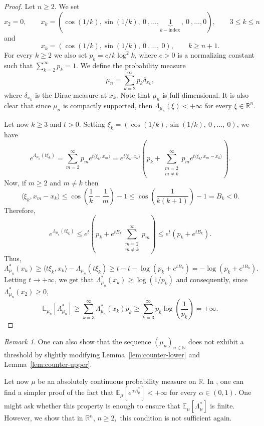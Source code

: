 \documentclass[11pt,a4paper]{article} %
\theoremstyle{definition}
\theoremstyle{remark}
\newtheorem{remark}[theorem]{Remark}
\newcommand{\1}{\mathds{1}}
\begin{document}
\begin{proof}
Let $n\geq 2$. We set $$x_2=0, \qquad x_k=(\cos (1/k), \sin (1/k),
\ 0\ , \ldots,\underbrace{1}_{k-\text{index} \ } ,\ 0\ ,\ldots,0), \qquad 3 \leq k\leq n $$ and $$x_k=(\cos(1/k),\sin(1/k), \ 0\ ,\ldots, \ 0), \qquad k \geq n+1 .$$ For every $k \geq 2$ we also set  $p_k=c/k \log^2 k$, where $c>0$ is a normalizing constant such that $\sum_{k=2}^{\infty}p_k=1$. We define the probability measure $$\mu_n= \sum\limits_{k=2}^{\infty} p_k \delta_{x_k},$$ where $\delta_{x_k}$ is the Dirac measure at $x_k$. Note that $\mu_n$ is full-dimensional. It is also clear that  since $\mu_n$ is compactly supported, then $\Lambda_{\mu_n}(\xi) < +\infty$ for every $\xi \in \mathbb{R}^n$.

 Let now $k \geq 3$ and $t>0$. Setting $\xi_k=(\cos(1/k),\sin(1/k), \ 0\ ,\ldots, \ 0)$, we have $$e^{\Lambda_{\mu_n}(t\xi_k)} = \sum\limits_{m=2}^{\infty}p_m e^{t\langle \xi_k, x_m \rangle} = e^{t \langle \xi_k, x_k\rangle} \left(p_k+ \sum\limits_{\substack{m=2 \\ m \neq k}}^{\infty}p_m e^{t \langle \xi_k,x_m-x_k \rangle} \right).$$
Now, if $m \geq 2$ and $m \neq k$ then $$\langle \xi_k, x_m-x_k \rangle \leq \cos \left(\frac{1}{k}-\frac{1}{m}\right)-1 \leq \cos\left( \frac{1}{k(k+1)} \right)-1=B_k<0.$$
Therefore, $$e^{\Lambda_{\mu_n}(t\xi_k)} \leq e^{t} \left(p_k +e^{tB_k}\sum\limits_{\substack{m=2 \\ m \neq k}}^{\infty}p_m \right) \leq e^t \left(p_k +e^{tB_k} \right).$$
Thus, $$\Lambda_{\mu_n}^{\ast}(x_k) \geq \langle t\xi_k, x_k\rangle -\Lambda_{\mu_n}(t\xi_k) \geq t-t-\log(p_k+e^{tB_k})=-\log(p_k+e^{tB_k}).$$
Letting  $t \to +\infty$, we get that $\Lambda_{\mu_n}^{\ast}(x_k) \geq \log (1/p_k)$ and consequently, since $\Lambda_{\mu_n}^{\ast}(x_2)\geq 0$, $$\mathbb{E}_{\mu_n}[\Lambda_{\mu_n}^{\ast}] \geq \sum\limits_{k=3}^{\infty} \Lambda_{\mu_n}^{\ast}(x_k)p_k \geq \sum\limits_{k=3}^{\infty} p_k \log \left( \frac{1}{p_k} \right)= +\infty. $$
\end{proof}

\begin{remark}
    One can also show that the sequence $(\mu_n)_{n \in \mathbb{N}}$ does not exhibit a threshold by slightly modifying Lemma~\ref{lem:counter-lower} and Lemma~\ref{lem:counter-upper}. 
\end{remark}


Let now $\mu$ be an absolutely continuous probability measure on $\mathbb{R}$. In \cite[Remark 3.3]{BC}, one can find a simpler proof of the fact that $\mathbb{E}_{\mu}[e^{\alpha\Lambda_{\mu}^\ast}]<+\infty$ for every $\alpha \in (0,1)$. One might ask whether this property is enough to ensure that $\mathbb{E}_{\mu}[\Lambda_{\mu}^{\ast}]$ is finite. However, we show that in $\mathbb{R}^n, \, n \geq 2 , $ this condition is not sufficient again.
\end{document}
